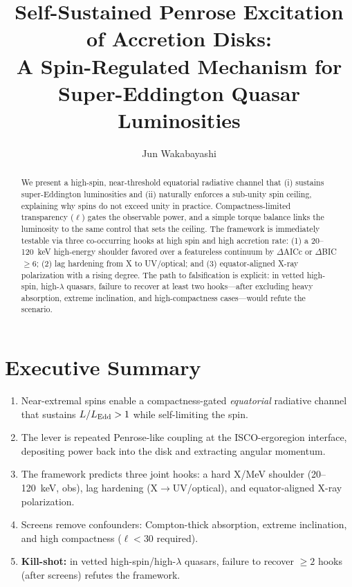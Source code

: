 \documentclass[twocolumn]{aastex701}
\newcommand{\ellcrit}{30}
\newcommand{\ellhard}{\ell<\ellcrit}         %
\newenvironment{tenumerate}{%
  \begin{enumerate}\setlength{\itemsep}{0pt}\setlength{\parsep}{0pt}\setlength{\parskip}{0pt}%
}{\end{enumerate}}
\begin{document}
\title{Self-Sustained Penrose Excitation of Accretion Disks:\\
A Spin-Regulated Mechanism for Super-Eddington Quasar Luminosities}

\author[0009-0008-1891-4579]{Jun Wakabayashi}

\begin{abstract}
We present a high-spin, near-threshold equatorial radiative channel that (i) sustains super-Eddington luminosities and (ii) naturally enforces a sub-unity spin ceiling, explaining why spins do not exceed unity in practice. Compactness-limited transparency ($\ell$) gates the observable power, and a simple torque balance links the luminosity to the same control that sets the ceiling. The framework is immediately testable via three co-occurring hooks at high spin and high accretion rate: (1) a 20--120~keV high-energy shoulder favored over a featureless continuum by $\Delta$AICc or $\Delta$BIC $\ge 6$; (2) lag hardening from X to UV/optical; and (3) equator-aligned X-ray polarization with a rising degree. The path to falsification is explicit: in vetted high-spin, high-$\lambda$ quasars, failure to recover at least two hooks---after excluding heavy absorption, extreme inclination, and high-compactness cases---would refute the scenario.
\end{abstract}


\section*{Executive Summary}
\begin{tenumerate}
  \item Near-extremal spins enable a compactness-gated \emph{equatorial} radiative channel that sustains $L/L_{\rm Edd}>1$ while self-limiting the spin.
  \item The lever is repeated Penrose-like coupling at the ISCO-ergoregion interface, depositing power back into the disk and extracting angular momentum.
  \item The framework predicts three joint hooks: a hard X/MeV shoulder (20--120~keV, obs), lag hardening (X$\to$UV/optical), and equator-aligned X-ray polarization.
  \item Screens remove confounders: Compton-thick absorption, extreme inclination, and high compactness ($\ellhard$ required).
  \item \textbf{Kill-shot:} in vetted high-spin/high-$\lambda$ quasars, failure to recover $\ge\!2$ hooks (after screens) refutes the framework.
\end{tenumerate}
\end{document}
